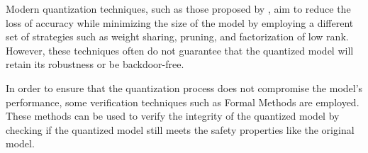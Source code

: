 Modern quantization techniques, such as those proposed by \cite{Zhu2020Survey, han2015deepcompression, han2020understanding, jacob2018quantization, Cai2020Certified, Zhou2017Incremental}, aim to reduce the loss of accuracy while minimizing the size of the model by employing a different set of strategies such as weight sharing, pruning, and factorization of low rank. However, these techniques often do not guarantee that the quantized model will retain its robustness or be backdoor-free.

In order to ensure that the quantization process does not compromise the model's performance, some verification techniques such as Formal Methods are employed. These methods can be used to verify the integrity of the quantized model by checking if the quantized model still meets the safety properties like the original model.
\begin{comment}
    
    Therefore, it is essencial to have a robust mehtod to verify the integrity of QNNs, ensuring they still meet their requirements and perform securily to their intended tasks. 
    
    
    While quantization can make models more efficient, it is crucial to verify that the quantized model still meets the required performance standards. 
    
    Think of a scenario where a quantized model is embbeded in a medical device for a real-time diagnostics or a self-driving car where the most precision is required. In such cases, any degradation in model performance due to quantization is unacceptable. Therefore, given the important of these applications, it is essential to have a robust method for verifying the integrity of quantized models.
    
    ANN are widely used in various applications, but their computational and memory resource demands are high \cite{amir2021smt, han2020understanding, abdi2021counterexample, song2023qnnrepair}. Quantization is a crucial technique to mitigate this problem by reducing the bit-width (from 32-bit floating-point to 8-bit integers or even binary) used to represent weights, biases, and activations, making networks more efficient on embedded and low-power devices \cite{amir2021smt, han2020understanding,song2023qnnrepair, abdi2021counterexample, Cai2020Certified}.
\end{comment}
